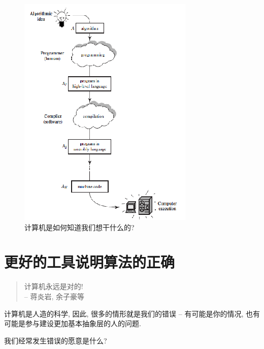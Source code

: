 \begin{figure}[h!]
	\centering
	\includegraphics[scale=0.8]{4-programs/figs/machine-note}
	\caption{计算机是如何知道我们想干什么的?}
	\label{figs:do-we-want}
	
\end{figure}


\section{更好的工具说明算法的正确}

\begin{quote}
	计算机永远是对的! \\
	\hfill -- 蒋炎岩, 余子豪等
\end{quote}

计算机是人造的科学, 因此, 很多的情形就是我们的错误 -- 有可能是你的情况, 也有可能是参与建设更加基本抽象层的人的问题. 

\begin{bonus}
	我们经常发生错误的愿意是什么? 
\end{bonus}


